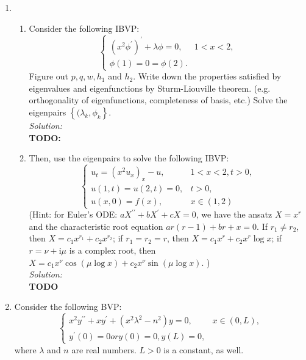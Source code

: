 \documentclass[10pt]{amsart}
\newcommand{\I}{\mathrm{i}}
\theoremstyle{nonumberplain}
\begin{document}
\begin{enumerate}[label={\bf {\arabic*}:}]
\newpage

\item
\begin{enumerate}
\item Consider the following IBVP:
$$
\begin{cases}
(x^2\phi^\prime)^\prime + \lambda \phi = 0, & 1 < x < 2, \\
\phi(1) = 0 = \phi(2).
\end{cases}
$$
Figure out $p, q, w, h_1$ and $h_2$.
Write down the properties satisfied by eigenvalues and eigenfunctions by Sturm-Liouville theorem. (e.g. orthogonality of eigenfunctions, completeness of basis, etc.)
Solve the eigenpairs $\left\{ (\lambda_k, \phi_k \right\}$. \\

\noindent
\textit{Solution:} \\
\textbf{TODO: }

\newpage


\item Then, use the eigenpairs to solve the following IBVP:
$$
\begin{cases}
u_t = (x^2u_x)_x - u, &1 < x< 2, t> 0, \\
u(1, t) = u(2, t) = 0, &t > 0, \\
u(x, 0) = f(x), &x \in (1, 2)
\end{cases}
$$
(Hint: for Euler's ODE: $aX^{\prime\prime} + bX^\prime + cX = 0$, we have the ansatz $X = x^r$ and the characteristic root equation $ar(r- 1) + br + x = 0$.
If $r_1 \neq r_2$, then $X = c_1x^{r_1} + c_2x^{r_2}$;
if $r_1 = r_2 = r$, then $X = c_1x^r + c_2x^r \log x$;
if $r = \nu + \I \mu$ is a complex root, then $X = c_1x^\nu \cos (\mu \log x) + c_2 x^\nu \sin(\mu \log x)$. ) \\

\noindent
\textit{Solution:} \\
\textbf{TODO} \\

\end{enumerate}

\newpage

\item Consider the following BVP:
$$
\begin{cases}
x^2y^{\prime\prime} + xy^\prime + (x^2\lambda^2 - n^2)y = 0, &x \in (0, L), \\
y^\prime(0) = 0 or y(0) = 0, y(L) = 0,
\end{cases}
$$
where $\lambda$ and $n$ are real numbers.
$L > 0$ is a constant, as well.


\end{enumerate}
\end{document}
